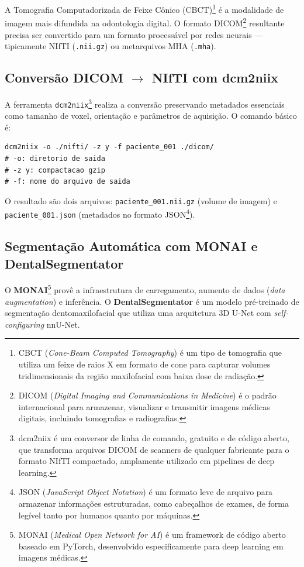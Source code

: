 A Tomografia Computadorizada de Feixe Cônico (CBCT)\footnote{CBCT
(\textit{Cone-Beam Computed Tomography}) é um tipo de tomografia que
utiliza um feixe de raios X em formato de cone para capturar volumes
tridimensionais da região maxilofacial com baixa dose de radiação.} é
a modalidade de imagem mais difundida na odontologia digital. O
formato DICOM\footnote{DICOM (\textit{Digital Imaging and Communications
in Medicine}) é o padrão internacional para armazenar, visualizar e
transmitir imagens médicas digitais, incluindo tomografias e
radiografias.} resultante precisa ser convertido para um formato
processável por redes neurais — tipicamente NIfTI (\texttt{.nii.gz})
ou metarquivos MHA (\texttt{.mha}).

\subsection{Conversão DICOM $\rightarrow$ NIfTI com dcm2niix}

A ferramenta \texttt{dcm2niix}\footnote{dcm2niix é um conversor de
linha de comando, gratuito e de código aberto, que transforma
arquivos DICOM de scanners de qualquer fabricante para o formato
NIfTI compactado, amplamente utilizado em pipelines de deep
learning.} realiza a conversão preservando metadados essenciais
como tamanho de voxel, orientação e parâmetros de aquisição. O
comando básico é:

\begin{lstlisting}[style=bashstyle, caption={Conversão de DICOM para NIfTI com dcm2niix}, label={lst:dcm2niix}]
dcm2niix -o ./nifti/ -z y -f paciente_001 ./dicom/
# -o: diretorio de saida
# -z y: compactacao gzip
# -f: nome do arquivo de saida
\end{lstlisting}

O resultado são dois arquivos: \texttt{paciente\_001.nii.gz} (volume
de imagem) e \texttt{paciente\_001.json} (metadados no formato
JSON\footnote{JSON (\textit{JavaScript Object Notation}) é um formato
leve de arquivo para armazenar informações estruturadas, como
cabeçalhos de exames, de forma legível tanto por humanos quanto por
máquinas.}).

\subsection{Segmentação Automática com MONAI e DentalSegmentator}

O \textbf{MONAI}\footnote{MONAI (\textit{Medical Open Network for AI})
é um framework de código aberto baseado em PyTorch, desenvolvido
especificamente para deep learning em imagens médicas.} provê a
infraestrutura de carregamento, aumento de dados (\textit{data
augmentation}) e inferência. O \textbf{DentalSegmentator} é um modelo
pré-treinado de segmentação dentomaxilofacial que utiliza uma
arquitetura 3D U-Net com \textit{self-configuring} nnU-Net.


